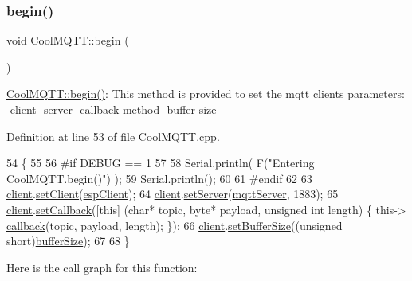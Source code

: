 \subsubsection{\texorpdfstring{begin()}{begin()}}
{\footnotesize\ttfamily void Cool\+M\+Q\+T\+T\+::begin (\begin{DoxyParamCaption}{ }\end{DoxyParamCaption})}

\hyperlink{class_cool_m_q_t_t_ac9248808641ebf3054ed0620ea9d0100}{Cool\+M\+Q\+T\+T\+::begin()}\+: This method is provided to set the mqtt client\textquotesingle{}s parameters\+: -\/client -\/server -\/callback method -\/buffer size 

Definition at line 53 of file Cool\+M\+Q\+T\+T.\+cpp.


\begin{DoxyCode}
54 \{ 
55 
56 \textcolor{preprocessor}{#if DEBUG == 1 }
57 
58     Serial.println( F(\textcolor{stringliteral}{"Entering CoolMQTT.begin()"}) );
59     Serial.println();
60 
61 \textcolor{preprocessor}{#endif}
62 
63     \hyperlink{class_cool_m_q_t_t_afed1372683c44893b4668d0f1771f514}{client}.\hyperlink{class_cool_pub_sub_client_a7ee119b786010561ab6a9afa0798e91d}{setClient}(\hyperlink{class_cool_m_q_t_t_acc30a0200967374a524092a8a806502a}{espClient});
64     \hyperlink{class_cool_m_q_t_t_afed1372683c44893b4668d0f1771f514}{client}.\hyperlink{class_cool_pub_sub_client_a947e70c394c66c7d08d0c53caf8425e3}{setServer}(\hyperlink{class_cool_m_q_t_t_ab8bb951f87ddbf92db74c2ad16a3e53e}{mqttServer}, 1883);    
65     \hyperlink{class_cool_m_q_t_t_afed1372683c44893b4668d0f1771f514}{client}.\hyperlink{class_cool_pub_sub_client_ac5cab7658f1bdded32131241e468e661}{setCallback}([\textcolor{keyword}{this}] (\textcolor{keywordtype}{char}* topic, byte* payload, \textcolor{keywordtype}{unsigned} \textcolor{keywordtype}{int} length) \{ this->
      \hyperlink{class_cool_m_q_t_t_a30d82ad665bfb603f46ecdbc290775df}{callback}(topic, payload, length); \});
66     \hyperlink{class_cool_m_q_t_t_afed1372683c44893b4668d0f1771f514}{client}.\hyperlink{class_cool_pub_sub_client_a4f83e54f1ba96e32f725d93cdec283b7}{setBufferSize}((\textcolor{keywordtype}{unsigned} \textcolor{keywordtype}{short})\hyperlink{class_cool_m_q_t_t_a7f3cf26b51d6770f216e42c5ef13ca9f}{bufferSize});
67 
68 \}
\end{DoxyCode}
Here is the call graph for this function\+:\nopagebreak
